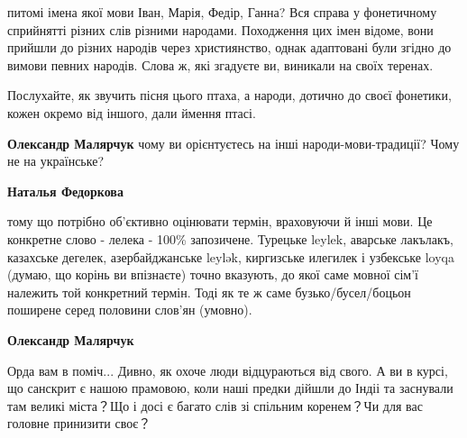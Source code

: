 \begin{itemize}
\begin{itemize}
питомі імена якої мови Іван, Марія, Федір, Ганна? Вся справа у фонетичному
сприйнятті різних слів різними народами. Походження цих імен відоме, вони
прийшли до різних народів через християнство, однак адаптовані були згідно до
вимови певних народів. Слова ж, які згадуєте ви, виникали на своїх теренах.


 
Послухайте, як звучить пісня цього птаха, а народи, дотично до своєї фонетики, кожен окремо від іншого, дали ймення птасі.

 
\textbf{Олександр Малярчук} чому ви орієнтуєтесь на інші народи-мови-традиції? Чому не на українське?

 
\textbf{Наталья Федоркова} 

тому що потрібно об'єктивно оцінювати термін, враховуючи й інші мови. Це
конкретне слово - лелека - 100\% запозичене. Турецьке leylek, аварське лакълакъ,
казахське дегелек, азербайджанське leylək, киргизське илегилек і узбекське
loyqa (думаю, що корінь ви впізнаєте) точно вказують, до якої саме мовної сім'ї
належить той конкретний термін. Тоді як те ж саме бузько/бусел/боцьон поширене
серед половини слов'ян (умовно).


 
\textbf{Олександр Малярчук} 

Орда вам в поміч... Дивно, як охоче люди відцураються від свого. А ви в курсі,
що санскрит є нашою прамовою, коли наші предки дійшли до Індіі та заснували там
великі міста？Що і досі є багато слів зі спільним коренем？Чи для вас головне
принизити своє？


\end{itemize}
\end{itemize}

